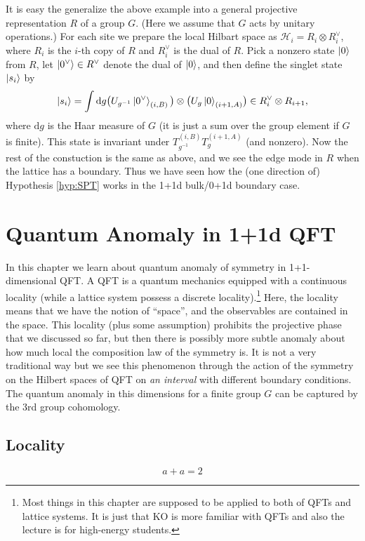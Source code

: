 \documentclass[
]{scrartcl}
\numberwithin{equation}{section}
\theoremstyle{definition}
\theoremstyle{definition}
\theoremstyle{definition}
\theoremstyle{definition}
\theoremstyle{remark}
\begin{document}
It is easy the generalize the above example into a general projective representation \(R\) of a group \(G\). (Here we assume that \(G\) acts by unitary operations.)
For each site we prepare the local Hilbart space as \(\mathcal{H}_i = R_i \otimes R^\vee_i\), where \(R_i\) is the \(i\)-th copy of \(R\) and \(R^\vee_i\) is the dual of \(R\).
Pick a nonzero state \(\ket{0}\) from \(R\), let \(\ket{0^\vee} \in R^\vee\) denote the dual of \(\ket{0}\), and then define the singlet state \(\ket{s_i}\) by
\begin{equation}
  \label{eq:ketsiGeneral}
  \ket{s_i} = \int \mathrm{d}g \bigl(U_{g^{-1}}\ket{0^\vee}_{(i,B)}\big)\otimes \bigl(U_{g}\ket{0}_{(i+1,A)}\bigr) \in R_{i}^\vee \otimes R_{i+1},
\end{equation}
where \(\mathrm{d}g\) is the Haar measure of \(G\) (it is just a sum over the group element if \(G\) is finite).
This state is invariant under \(T_{g^{-1}}^{(i,B)}T_g^{(i+1,A)}\) (and nonzero).
Now the rest of the constuction is the same as above, and we see the edge mode in \(R\) when the lattice has a boundary.
Thus we have seen how the (one direction of) Hypothesis \ref{hyp:SPT} works in the 1+1d bulk/0+1d boundary case.

\hypertarget{quantum-anomaly-in-11d-qft}{%
\section{Quantum Anomaly in 1+1d QFT}\label{quantum-anomaly-in-11d-qft}}

In this chapter we learn about quantum anomaly of symmetry in 1+1-dimensional QFT. A QFT is a quantum mechanics equipped with a continuous locality (while a lattice system possess a discrete locality).\footnote{Most things in this chapter are supposed to be applied to both of QFTs and lattice systems. It is just that KO is more familiar with QFTs and also the lecture is for high-energy students.} Here, the locality means that we have the notion of ``space'', and the observables are contained in the space.
This locality (plus some assumption) prohibits the projective phase that we discussed so far, but then there is possibly more subtle anomaly about how much local the composition law of the symmetry is.
It is not a very traditional way but we see this phenomenon through the action of the symmetry on the Hilbert spaces of QFT on \emph{an interval} with different boundary conditions. The quantum anomaly in this dimensions for a finite group \(G\) can be captured by the 3rd group cohomology.

\hypertarget{locality}{%
\subsection{Locality}\label{locality}}

\begin{equation}
    \label{eq:test}
    a+a = 2
\end{equation}

\printbibliography
\end{document}
